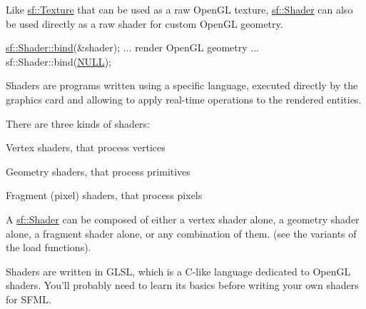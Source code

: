 Like \hyperlink{classsf_1_1_texture}{sf\-::\-Texture} that can be used as a raw Open\-G\-L texture, \hyperlink{classsf_1_1_shader}{sf\-::\-Shader} can also be used directly as a raw shader for custom Open\-G\-L geometry. 
\begin{DoxyCode}
\hyperlink{classsf_1_1_shader_a09778f78afcbeb854d608c8dacd8ea30}{sf::Shader::bind}(&shader);
... render OpenGL geometry ...
sf::Shader::bind(\hyperlink{internal_8h_a070d2ce7b6bb7e5c05602aa8c308d0c4}{NULL});
\end{DoxyCode}


Shaders are programs written using a specific language, executed directly by the graphics card and allowing to apply real-\/time operations to the rendered entities.

There are three kinds of shaders\-: \begin{DoxyItemize}
\item Vertex shaders, that process vertices \item Geometry shaders, that process primitives \item Fragment (pixel) shaders, that process pixels\end{DoxyItemize}
A \hyperlink{classsf_1_1_shader}{sf\-::\-Shader} can be composed of either a vertex shader alone, a geometry shader alone, a fragment shader alone, or any combination of them. (see the variants of the load functions).

Shaders are written in G\-L\-S\-L, which is a C-\/like language dedicated to Open\-G\-L shaders. You'll probably need to learn its basics before writing your own shaders for S\-F\-M\-L.

